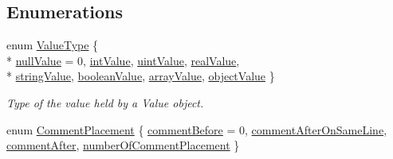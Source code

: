 \subsection*{Enumerations}
\begin{DoxyCompactItemize}
\item 
enum \hyperlink{namespace_json_a7d654b75c16a57007925868e38212b4e}{Value\+Type} \{ \\*
\hyperlink{namespace_json_a7d654b75c16a57007925868e38212b4ea7d9899633b4409bd3fc107e6737f8391}{null\+Value} = 0, 
\hyperlink{namespace_json_a7d654b75c16a57007925868e38212b4eae5a9d708d5c9e23ae9bf98898522512d}{int\+Value}, 
\hyperlink{namespace_json_a7d654b75c16a57007925868e38212b4eaea788d9a3bb00adc6d68d97d43e1ccd3}{uint\+Value}, 
\hyperlink{namespace_json_a7d654b75c16a57007925868e38212b4eab837c7b869c14d8be712deb45c9e490e}{real\+Value}, 
\\*
\hyperlink{namespace_json_a7d654b75c16a57007925868e38212b4ea804ef857affea2d415843c73f261c258}{string\+Value}, 
\hyperlink{namespace_json_a7d654b75c16a57007925868e38212b4ea14c30dbf4da86f7b809be299f671f7fd}{boolean\+Value}, 
\hyperlink{namespace_json_a7d654b75c16a57007925868e38212b4eadc8f264f36b55b063c78126b335415f4}{array\+Value}, 
\hyperlink{namespace_json_a7d654b75c16a57007925868e38212b4eae8386dcfc36d1ae897745f7b4f77a1f6}{object\+Value}
 \}
\begin{DoxyCompactList}\small\item\em Type of the value held by a Value object. \end{DoxyCompactList}\item 
enum \hyperlink{namespace_json_a4fc417c23905b2ae9e2c47d197a45351}{Comment\+Placement} \{ \hyperlink{namespace_json_a4fc417c23905b2ae9e2c47d197a45351a52f1733775460517b2ea6bedf4906d52}{comment\+Before} = 0, 
\hyperlink{namespace_json_a4fc417c23905b2ae9e2c47d197a45351a008a230a0586de54f30b76afe70fdcfa}{comment\+After\+On\+Same\+Line}, 
\hyperlink{namespace_json_a4fc417c23905b2ae9e2c47d197a45351ac5784ca53b12250888ddb642b06aebef}{comment\+After}, 
\hyperlink{namespace_json_a4fc417c23905b2ae9e2c47d197a45351abcbd3eb00417335e094e4a03379659b5}{number\+Of\+Comment\+Placement}
 \}
\end{DoxyCompactItemize}
